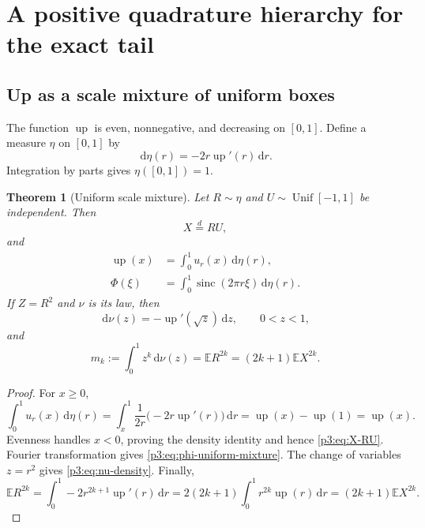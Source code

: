 \documentclass[11pt,oneside]{article}
\numberwithin{equation}{section}
\newtheorem{theorem}{Theorem}[section]
\theoremstyle{definition}
\theoremstyle{remark}
\newcommand{\E}{\mathbb E}
\newcommand{\Up}{\operatorname{up}}
\newcommand{\sinc}{\operatorname{sinc}}
\newcommand{\dd}{\,\mathrm d}
\begin{document}
\section{A positive quadrature hierarchy for the exact tail}
\label{p3:sec:positive}

\subsection{Up as a scale mixture of uniform boxes}

The function $\Up$ is even, nonnegative, and decreasing on $[0,1]$.  Define a measure
$\eta$ on $[0,1]$ by
\begin{equation}
 \dd\eta(r)=-2r\Up'(r)\dd r.
 \label{p3:eq:eta}
\end{equation}
Integration by parts gives $\eta([0,1])=1$.

\begin{theorem}[Uniform scale mixture]
\label{p3:thm:scale-mixture}
Let $R\sim\eta$ and $U\sim\operatorname{Unif}[-1,1]$ be independent.  Then
\begin{equation}
 X\overset d=RU,
 \label{p3:eq:X-RU}
\end{equation}
and
\begin{align}
 \Up(x)&=\int_0^1u_r(x)\dd\eta(r),
 \label{p3:eq:up-uniform-mixture}\\
 \Phi(\xi)&=\int_0^1\sinc(2\pi r\xi)\dd\eta(r).
 \label{p3:eq:phi-uniform-mixture}
\end{align}
If $Z=R^2$ and $\nu$ is its law, then
\begin{equation}
 \dd\nu(z)=-\Up'(\sqrt z)\dd z,
 \qquad 0<z<1,
 \label{p3:eq:nu-density}
\end{equation}
and
\begin{equation}
 m_k:=\int_0^1z^k\dd\nu(z)
 =\E R^{2k}=(2k+1)\E X^{2k}.
 \label{p3:eq:nu-moments}
\end{equation}
\end{theorem}

\begin{proof}
For $x\ge0$,
\[
 \int_0^1u_r(x)\dd\eta(r)
 =\int_x^1\frac{1}{2r}\bigl(-2r\Up'(r)\bigr)\dd r
 =\Up(x)-\Up(1)=\Up(x).
\]
Evenness handles $x<0$, proving the density identity and hence \cref{p3:eq:X-RU}.
Fourier transformation gives \cref{p3:eq:phi-uniform-mixture}.  The change of variables
$z=r^2$ gives \cref{p3:eq:nu-density}.  Finally,
\[
 \E R^{2k}=\int_0^1-2r^{2k+1}\Up'(r)\dd r
 =2(2k+1)\int_0^1r^{2k}\Up(r)\dd r
 =(2k+1)\E X^{2k}.
\]
\end{proof}
\end{document}
